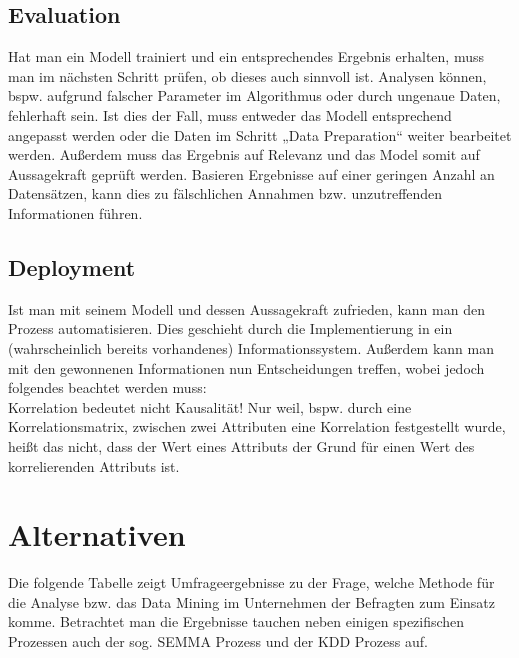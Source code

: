 \subsection{Evaluation}
\label{sec:process:crispdm:eval}

Hat man ein Modell trainiert und ein entsprechendes Ergebnis erhalten, muss man
im nächsten Schritt prüfen, ob dieses auch sinnvoll ist. Analysen können, bspw.
aufgrund falscher Parameter im Algorithmus oder durch ungenaue Daten,
fehlerhaft sein. Ist dies der Fall, muss entweder das Modell entsprechend
angepasst werden oder die Daten im Schritt „Data Preparation“ weiter bearbeitet
werden. Außerdem muss das Ergebnis auf Relevanz und das Model somit auf
Aussagekraft geprüft werden. Basieren Ergebnisse auf einer geringen Anzahl an
Datensätzen, kann dies zu fälschlichen Annahmen bzw. unzutreffenden
Informationen führen.

\subsection{Deployment}
\label{sec:process:crispdm:depl}

Ist man mit seinem Modell und dessen Aussagekraft zufrieden, kann man den
Prozess automatisieren. Dies geschieht durch die Implementierung in ein
(wahrscheinlich bereits vorhandenes) Informationssystem. Außerdem kann man mit
den gewonnenen Informationen nun Entscheidungen treffen, wobei jedoch folgendes
beachtet werden muss: \\
Korrelation bedeutet nicht Kausalität! Nur weil, bspw. durch eine
Korrelationsmatrix, zwischen zwei Attributen eine Korrelation festgestellt
wurde, heißt das nicht, dass der Wert eines Attributs der Grund für einen Wert
des korrelierenden Attributs ist.

\section{Alternativen}
\label{sec:process:alt}

Die folgende Tabelle zeigt Umfrageergebnisse zu der Frage, welche Methode für
die Analyse bzw. das Data Mining im Unternehmen der Befragten zum Einsatz komme.
Betrachtet man die Ergebnisse tauchen neben einigen spezifischen Prozessen auch
der sog. SEMMA Prozess und der KDD Prozess auf.

